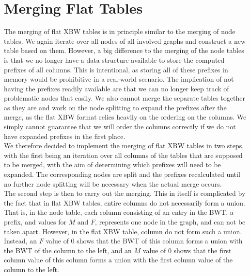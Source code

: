 \documentclass[a4paper,12pt,twoside,BCOR=10mm]{scrbook}
\begin{document}
\section{Merging Flat Tables}
%

The merging of flat XBW tables is in principle similar to the merging of node tables. 
We again iterate over all nodes of all involved graphs and construct a new table 
based on them. 
However, a big difference to the merging of the node tables is that we no longer have 
a data structure available to store the computed prefixes of all columns. 
This is intentional, as storing all of these prefixes in memory would be prohibitive 
in a real-world scenario. The implication of not having the prefixes readily available 
are that we can no longer keep track of problematic nodes that easily. 
We also cannot merge the separate tables together as they are and work on the node splitting to expand the prefixes 
after the merge, as the flat XBW format relies heavily on the ordering on the columns. 
We simply cannot guarantee that we will order the columns correctly 
if we do not have expanded prefixes in the first place. \\
We therefore decided to implement the merging of flat XBW tables in two steps, 
with the first being an iteration over all columns of the tables that are supposed to be merged, 
with the aim of determining which prefixes will need to be expanded. The corresponding nodes are 
split and the prefixes recalculated until no further node splitting will be necessary when the actual 
merge occurs. \\
The second step is then to carry out the merging. This in itself is complicated by the fact 
that in flat XBW tables, entire columns do not necessarily form a union. That is, 
in the node table, each column consisting of an entry in the BWT, a prefix, and values for $ M $ and $ F $, 
represents one node in the graph, and can not be taken apart. 
However, in the flat XBW table, column do not form such a union. 
Instead, an $ F $ value of 0 shows that the BWT of this column forms a union with the BWT of the column to the left, 
and an $ M $ value of 0 shows that the first column value of this column forms a union 
with the first column value of the column to the left.
\end{document}
